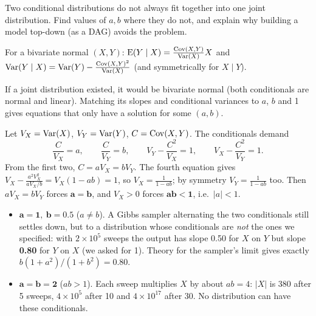 \documentclass[11pt]{article}
\begin{document}
\begin{restate}
Two conditional distributions do not always fit together into one joint distribution. Find values of $a,b$ where they do not, and explain why building a model top-down (as a DAG) avoids the problem.
\end{restate}

\begin{recall}
For a bivariate normal $(X,Y)$: $\mathrm{E}(Y\mid X)=\frac{\mathrm{Cov}(X,Y)}{\mathrm{Var}(X)}X$ and $\mathrm{Var}(Y\mid X)=\mathrm{Var}(Y)-\frac{\mathrm{Cov}(X,Y)^2}{\mathrm{Var}(X)}$ (and symmetrically for $X\mid Y$).
\end{recall}

\begin{keyidea}
If a joint distribution existed, it would be bivariate normal (both conditionals are normal and linear). Matching its slopes and conditional variances to $a$, $b$ and 1 gives equations that only have a solution for some $(a,b)$.
\end{keyidea}

\solution
{}
Let $V_X=\mathrm{Var}(X)$, $V_Y=\mathrm{Var}(Y)$, $C=\mathrm{Cov}(X,Y)$. The conditionals demand
\[
\frac C{V_X}=a,\qquad\frac C{V_Y}=b,\qquad V_Y-\frac{C^2}{V_X}=1,\qquad V_X-\frac{C^2}{V_Y}=1.
\]
 From the first two, $C=aV_X=bV_Y$. The fourth equation gives $V_X-\frac{a^2V_X^2}{aV_X/b}=V_X(1-ab)=1$, so $V_X=\frac1{1-ab}$; by symmetry $V_Y=\frac1{1-ab}$ too. Then $aV_X=bV_Y$ forces $\mathbf{a=b}$, and $V_X>0$ forces $\mathbf{ab<1}$, i.e.\ $|a|<1$.

\begin{itemize}
\item $\mathbf{a=1,\ b=0.5}$ ($a\neq b$). A Gibbs sampler alternating the two conditionals still settles down, but to a distribution whose conditionals are \emph{not} the ones we specified: with $2\times10^5$ sweeps the output has slope 0.50 for $X$ on $Y$ but slope \textbf{0.80} for $Y$ on $X$ (we asked for 1). Theory for the sampler's limit gives exactly $b(1+a^2)/(1+b^2)=0.80$.
\item $\mathbf{a=b=2}$ ($ab>1$). Each sweep multiplies $X$ by about $ab=4$: $|X|$ is 380 after 5 sweeps, $4\times10^{5}$ after 10 and $4\times10^{17}$ after 30. No distribution can have these conditionals.
\end{itemize}
\end{document}
